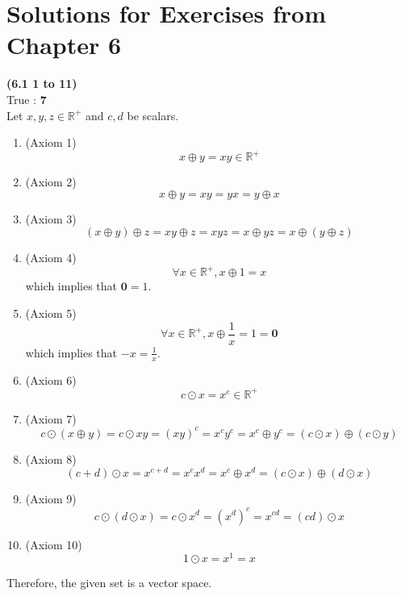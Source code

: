 \section{Solutions for Exercises from Chapter 6}
\textbf{(6.1 1 to 11)} \\
True : \textbf{7} \\
Let $x, y, z \in \mathbb{R}^+$ and $c, d$ be scalars.
\begin{enumerate}
	\item (Axiom 1) \begin{equation*}
		x \oplus y = xy \in \mathbb{R}^+
	\end{equation*}
	\item (Axiom 2)\begin{equation*}
		x \oplus y = xy = yx = y \oplus x
	\end{equation*}
	\item (Axiom 3)\begin{equation*}
		(x \oplus y) \oplus z = xy \oplus z = xyz = x \oplus yz = x \oplus (y \oplus z)
	\end{equation*}
	\item (Axiom 4)\begin{equation*}
		\forall x \in \mathbb{R}^+, x \oplus 1 = x
	\end{equation*}
	which implies that $\textbf{0} = 1$.
	\item (Axiom 5)\begin{equation*}
		\forall x \in \mathbb{R}^+, x \oplus \frac{1}{x} = 1 = \textbf{0}
	\end{equation*}
	which implies that $-x = \frac{1}{x}$.
	\item (Axiom 6)\begin{equation*}
		c \odot x = x ^ c \in \mathbb{R}^+
	\end{equation*}
	\item (Axiom 7)\begin{equation*}
		c \odot (x \oplus y) = c \odot xy = (xy) ^ c = x^cy^c = x^c \oplus y^c = (c \odot x) \oplus (c \odot y)
	\end{equation*}
	\item (Axiom 8)\begin{equation*}
		(c + d) \odot x = x ^ {c + d} = x^cx^d = x^c \oplus x^d = (c \odot x) \oplus (d \odot x)
	\end{equation*}
	\item (Axiom 9)\begin{equation*}
		c \odot (d \odot x) = c \odot x^d = (x^d)^c = x^{cd} = (cd) \odot x
	\end{equation*}
	\item (Axiom 10)\begin{equation*}
		1 \odot x = x ^ 1 = x
	\end{equation*}
\end{enumerate}
Therefore, the given set is a vector space. \\

